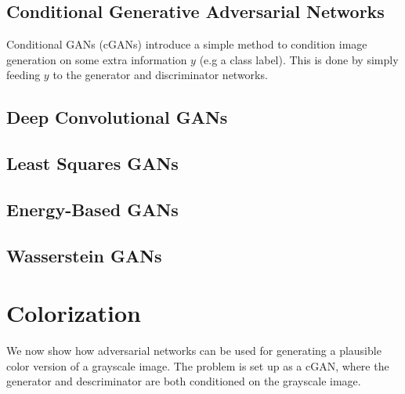 \documentclass{article}
\begin{document}
\subsection{Conditional Generative Adversarial Networks}
Conditional GANs (cGANs) introduce a simple method to condition image generation on some extra information $y$ (e.g a class label). This is done by simply feeding
$y$ to the generator and discriminator networks.



\subsection{Deep Convolutional GANs}


\subsection{Least Squares GANs}


\subsection{Energy-Based GANs}


\subsection{Wasserstein GANs}


\section{Colorization}
We now show how adversarial networks can be used for generating a plausible color version of a grayscale image.
The problem is set up as a cGAN, where the generator and descriminator are both conditioned on the grayscale image.
\end{document}
